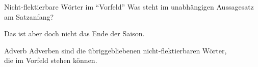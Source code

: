 \begin{frame}
  {Nicht-flektierbare Wörter im "`Vorfeld"'}
  \pause
  Was steht im unabhängigen Aussagesatz am Satzanfang?\\
  \pause
  {}
  \pause
  \begin{exe}
    \ex\label{ex:adverbenadkopulasundpartikeln038}
    \begin{xlist}
      \pause
      \pause
      \pause
      \pause
      \pause
      \pause
      \pause
      \pause
      \pause
      \pause
    \end{xlist}
    \Halbzeile
    \ex\label{ex:adverbenadkopulasundpartikeln044} Das ist aber \alert{doch} nicht das Ende der Saison.
  \end{exe}
  \pause
  \Viertelzeile
  \begin{block}{Adverb}
    Adverben sind die übriggebliebenen nicht-flektierbaren Wörter,\\
    die im Vorfeld stehen können.
  \end{block}
\end{frame}


